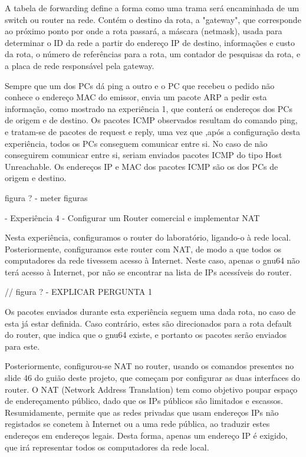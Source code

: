 \documentclass[article, a4paper, 11pt, oneside]{memoir}
\begin{document}
A tabela de forwarding define a forma como uma trama será encaminhada de um switch ou router na rede. Contém o destino da rota, a "gateway", que corresponde ao próximo ponto por onde a rota passará,
a máscara (netmask), usada para determinar o ID da rede a partir do endereço IP de destino, informações e custo da rota, o número de referências para a rota, um contador de pesquisas da rota, e a placa de rede responsável pela gateway.

Sempre que um dos PCs dá ping a outro e o PC que recebeu o pedido não conhece o endereço MAC do emissor, envia um pacote ARP a pedir esta informação, como mostrado na experiência 1, que conterá os endereços dos PCs de origem e de destino.
Os pacotes ICMP observados resultam do comando ping, e tratam-se de pacotes de request e reply, uma vez que ,após a configuração desta experiência, todos os PCs conseguem comunicar entre si.
No caso de não conseguirem comunicar entre si, seriam enviados pacotes ICMP do tipo Host Unreachable.
Os endereços IP e MAC dos pacotes ICMP são os dos PCs de origem e destino.

figura ? - meter figuras

- Experiência 4 - Configurar um Router comercial e implementar NAT

Nesta experiência, configuramos o router do laboratório, ligando-o à rede local. Posteriormente, configuramos este router
com NAT, de modo a que todos os computadores da rede tivessem acesso à Internet. Neste caso, apenas o gnu64 não terá acesso à Internet, por não se encontrar na lista de IPs acessíveis do router.

// figura ? - EXPLICAR PERGUNTA 1

Os pacotes enviados durante esta experiência seguem uma dada rota, no caso de esta já estar definida. Caso contrário, estes são direcionados para a rota default do router,
que indica que o gnu64 existe, e portanto os pacotes serão enviados para este.

Posteriormente, configurou-se NAT no router, usando os comandos presentes no slide 46 do guião deste projeto, que começam por configurar as duas interfaces do router.
O NAT (Network Address Translation) tem como objetivo poupar espaço de endereçamento público, dado que os IPs públicos são limitados e escassos.
Resumidamente, permite que as redes privadas que usam endereços IPs não registados se conetem à Internet ou a uma rede pública, ao traduzir estes endereços em endereços legais. 
Desta forma, apenas um endereço IP é exigido, que irá representar todos os computadores da rede local.
\end{document}
